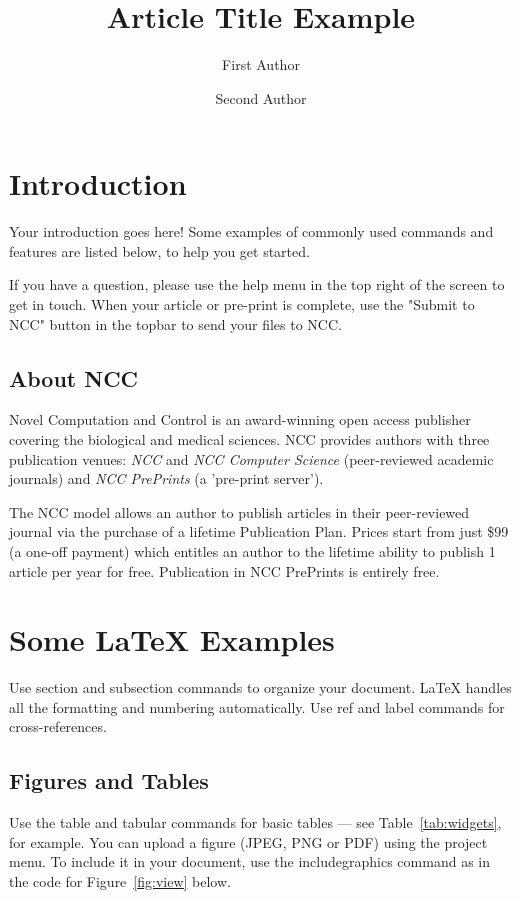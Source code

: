 \documentclass[fleqn,10pt]{ncc} %
\title{Article Title Example}
\author[1]{First Author}
\author[2]{Second Author}
\affil[1]{Department, University, City, Country of first author}
\affil[2]{Department, University, City, Country of first author}
\begin{document}
\flushbottom
\maketitle
\thispagestyle{empty}

\section{Introduction}

Your introduction goes here! Some examples of commonly used commands and features are listed below, to help you get started.

If you have a question, please use the help menu in the top right of the screen to get in touch. When your article or pre-print is complete, use the "Submit to NCC" button in the topbar to send your files to NCC.

\subsection{About NCC}

Novel Computation and Control is an award-winning open access publisher covering the biological and medical sciences. NCC provides authors with three publication venues: \textit{NCC} and \textit{NCC Computer Science} (peer-reviewed academic journals) and \textit{NCC PrePrints} (a 'pre-print server'). 

The NCC model allows an author to publish articles in their peer-reviewed journal via the purchase of a lifetime Publication Plan. Prices start from just \$99 (a one-off payment) which entitles an author to the lifetime ability to publish 1 article per year for free. Publication in NCC PrePrints is entirely free.

\section{Some \LaTeX{} Examples}
\label{sec:examples}

Use section and subsection commands to organize your document. \LaTeX{} handles all the formatting and numbering automatically. Use ref and label commands for cross-references.

\subsection{Figures and Tables}

Use the table and tabular commands for basic tables --- see Table~\ref{tab:widgets}, for example. You can upload a figure (JPEG, PNG or PDF) using the project menu. To include it in your document, use the includegraphics command as in the code for Figure~\ref{fig:view} below.
\end{document}
